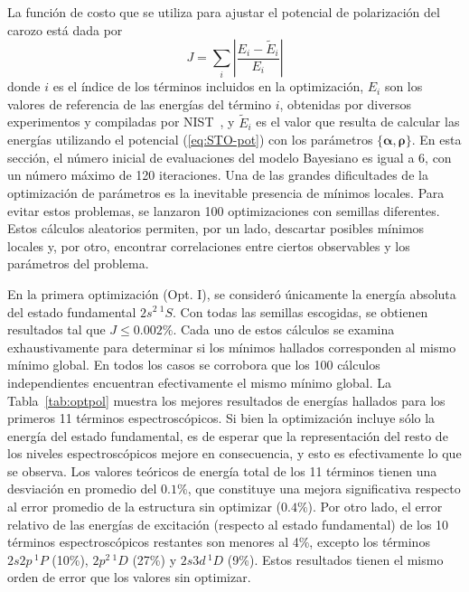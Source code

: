 La función de costo que se utiliza para ajustar el potencial de 
polarización del carozo está dada por 
\begin{equation}
J=\sum_{i} \left|\frac{E_{i}-\tilde{E}_{i}}{E_{i}} \right|
\label{eq:Jpol}
\end{equation}
donde $i$ es el índice de los términos incluidos en la optimización, 
$E_{i}$ son los valores de referencia de las energías del término $i$, 
obtenidas por diversos experimentos y compiladas por NIST~\cite{NIST}, y 
$\tilde{E}_{i}$ es el valor que resulta de calcular las energías 
utilizando el potencial (\ref{eq:STO-pot}) con los parámetros 
$\{\boldsymbol\alpha,\boldsymbol\rho\}$.
En esta sección, el número inicial de evaluaciones del modelo Bayesiano 
es igual a 6, con un número máximo de 120 iteraciones. Una de las 
grandes dificultades de la optimización de parámetros es la inevitable 
presencia de mínimos locales. Para evitar estos problemas, se lanzaron 
100 optimizaciones con semillas diferentes. Estos cálculos aleatorios
permiten, por un lado, descartar posibles mínimos locales y, por otro, 
encontrar correlaciones entre ciertos observables y los parámetros del 
problema. 

En la primera optimización (Opt. I), se consideró únicamente la energía
absoluta del estado fundamental $2s^2\,^1S$. Con todas las semillas 
escogidas, se obtienen resultados tal que $J\leq 0.002\%$. Cada uno de
estos cálculos se examina exhaustivamente para determinar si los mínimos 
hallados corresponden al mismo mínimo global. En todos los casos se 
corrobora que los 100 cálculos independientes encuentran efectivamente 
el mismo mínimo global. La Tabla~\ref{tab:optpol} muestra los mejores 
resultados de energías 
hallados para los primeros 11 términos espectroscópicos. Si bien la 
optimización incluye sólo la energía del estado fundamental, es de 
esperar que la representación del resto de los niveles espectroscópicos 
mejore en consecuencia, y esto es efectivamente lo que se observa. Los 
valores teóricos de energía total de los 11 términos tienen una 
desviación en promedio del $0.1\%$, que constituye una mejora 
significativa respecto al error promedio de la estructura sin optimizar
($0.4\%$). Por otro lado, el error relativo de las energías de 
excitación (respecto al estado fundamental) de los 10 términos 
espectroscópicos restantes son menores al 4\%, excepto los términos 
$2s2p\,^1\!P$ (10\%), $2p^2\,^1\!D$ (27\%) y $2s3d\,^1\!D$ (9\%). Estos 
resultados tienen el mismo orden de error que los valores sin optimizar.

